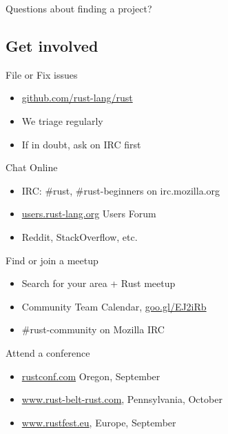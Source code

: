 \documentclass[aspectratio=169]{beamer}
\begin{document}
\begin{frame}
    \hfill Questions about finding a project?
\end{frame}

\subsection{Get involved}

\begin{frame}
    File or Fix issues
    \begin{itemize}
        \item \url{github.com/rust-lang/rust}
        \item We triage regularly
        \item If in doubt, ask on IRC first
    \end{itemize}
\end{frame}

\begin{frame}
    Chat Online
    \begin{itemize}
        \item IRC: \#rust, \#rust-beginners on irc.mozilla.org
        \item \url{users.rust-lang.org} Users Forum
        \item Reddit, StackOverflow, etc.
    \end{itemize}
\end{frame}

\begin{frame}
    Find or join a meetup
    \begin{itemize}
        \item Search for your area + Rust meetup
        \item Community Team Calendar, \url{goo.gl/EJ2iRb}
        \item \#rust-community on Mozilla IRC
    \end{itemize}
\end{frame}

\begin{frame}
    Attend a conference
    \begin{itemize}
        \item \url{rustconf.com} Oregon, September
        \item \url{www.rust-belt-rust.com}, Pennsylvania, October
        \item \url{www.rustfest.eu}, Europe, September
    \end{itemize}
\end{frame}
\end{document}
